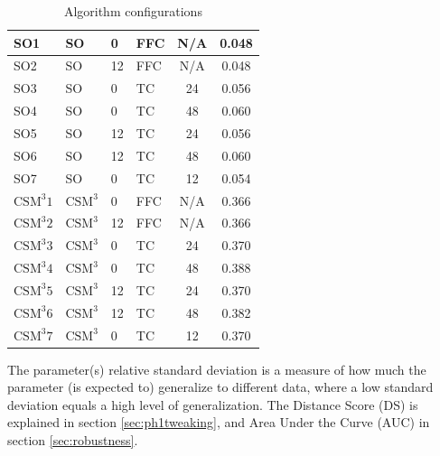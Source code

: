 \documentclass[12pt]{article}
\begin{document}
\begin{table}
\begin{tabular}{| l | l | p{2cm} | p{2cm} | c | c | }
    SO1 & SO & 0 & FFC & N/A & 0.048 \\\hline
    SO2 & SO & 12 & FFC & N/A & 0.048 \\\hline
    SO3 & SO & 0 & TC & 24 & 0.056 \\\hline
    SO4 & SO & 0 & TC & 48 & 0.060 \\\hline
    SO5 & SO & 12 & TC & 24 & 0.056 \\\hline
    SO6 & SO & 12 & TC & 48 & 0.060 \\\hline
    SO7 & SO & 0 & TC & 12 & 0.054 \\\hline\hline

    $\text{CSM}^{3}1$ & $\text{CSM}^{3}$  & 0 & FFC & N/A & 0.366 \\\hline
    $\text{CSM}^{3}2$ &$\text{CSM}^{3}$ & 12 & FFC & N/A & 0.366 \\\hline
    $\text{CSM}^{3}3$ &$\text{CSM}^{3}$ & 0 & TC & 24 & 0.370 \\\hline
    $\text{CSM}^{3}4$ &$\text{CSM}^{3}$ & 0 & TC & 48 & 0.388 \\\hline
    $\text{CSM}^{3}5$ &$\text{CSM}^{3}$ & 12 & TC & 24 & 0.370 \\\hline
    $\text{CSM}^{3}6$ &$\text{CSM}^{3}$ & 12 & TC & 48 & 0.382 \\\hline
    $\text{CSM}^{3}7$ &$\text{CSM}^{3}$ & 0 & TC & 12 & 0.370 \\\hline
  
  \end{tabular}
\caption{Algorithm configurations}
\label{tab:algoconfigs}
\end{table}
%
The parameter(s) relative standard deviation is a measure of how much the parameter (is expected to) generalize to different data, where a low standard deviation equals a high level of generalization. The Distance Score (DS) is explained in section \ref{sec:ph1tweaking}, and Area Under the Curve (AUC) in section \ref{sec:robustness}.
%
\end{document}
